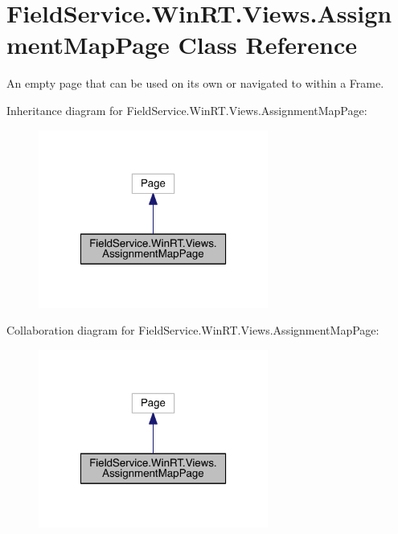 \hypertarget{class_field_service_1_1_win_r_t_1_1_views_1_1_assignment_map_page}{\section{Field\+Service.\+Win\+R\+T.\+Views.\+Assignment\+Map\+Page Class Reference}
\label{class_field_service_1_1_win_r_t_1_1_views_1_1_assignment_map_page}
}


An empty page that can be used on its own or navigated to within a Frame.  




Inheritance diagram for Field\+Service.\+Win\+R\+T.\+Views.\+Assignment\+Map\+Page\+:
\nopagebreak
\begin{figure}[H]
\begin{center}
\leavevmode
\includegraphics[width=214pt]{class_field_service_1_1_win_r_t_1_1_views_1_1_assignment_map_page__inherit__graph}
\end{center}
\end{figure}


Collaboration diagram for Field\+Service.\+Win\+R\+T.\+Views.\+Assignment\+Map\+Page\+:
\nopagebreak
\begin{figure}[H]
\begin{center}
\leavevmode
\includegraphics[width=214pt]{class_field_service_1_1_win_r_t_1_1_views_1_1_assignment_map_page__coll__graph}
\end{center}
\end{figure}
